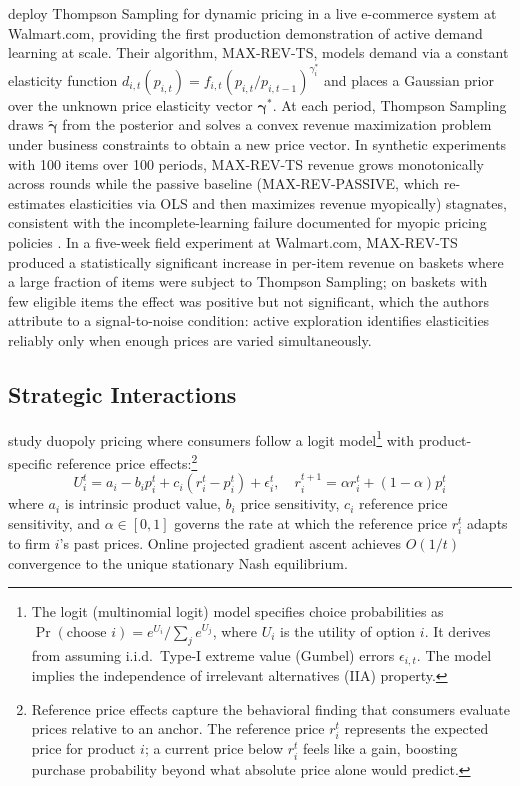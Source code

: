 \citet{Ganti2018} deploy Thompson Sampling for dynamic pricing in a live e-commerce system at Walmart.com, providing the first production demonstration of active demand learning at scale. Their algorithm, MAX-REV-TS, models demand via a constant elasticity function $d_{i,t}(p_{i,t}) = f_{i,t}(p_{i,t}/p_{i,t-1})^{\gamma^*_i}$ and places a Gaussian prior over the unknown price elasticity vector $\boldsymbol{\gamma}^*$. At each period, Thompson Sampling draws $\tilde{\boldsymbol{\gamma}}$ from the posterior and solves a convex revenue maximization problem under business constraints to obtain a new price vector. In synthetic experiments with 100 items over 100 periods, MAX-REV-TS revenue grows monotonically across rounds while the passive baseline (MAX-REV-PASSIVE, which re-estimates elasticities via OLS and then maximizes revenue myopically) stagnates, consistent with the incomplete-learning failure documented for myopic pricing policies \citep{Harrison2012}. In a five-week field experiment at Walmart.com, MAX-REV-TS produced a statistically significant increase in per-item revenue on baskets where a large fraction of items were subject to Thompson Sampling; on baskets with few eligible items the effect was positive but not significant, which the authors attribute to a signal-to-noise condition: active exploration identifies elasticities reliably only when enough prices are varied simultaneously.

\subsection{Strategic Interactions}

\citet{Guo2023} study duopoly pricing where consumers follow a logit model\footnote{The logit (multinomial logit) model specifies choice probabilities as $\Pr(\text{choose } i) = e^{U_i}/\sum_j e^{U_j}$, where $U_i$ is the utility of option $i$. It derives from assuming i.i.d.\ Type-I extreme value (Gumbel) errors $\epsilon_{i,t}$. The model implies the independence of irrelevant alternatives (IIA) property.} with product-specific reference price effects:\footnote{Reference price effects capture the behavioral finding that consumers evaluate prices relative to an anchor. The reference price $r^t_i$ represents the expected price for product $i$; a current price below $r^t_i$ feels like a gain, boosting purchase probability beyond what absolute price alone would predict.}
\begin{equation}
U^t_i = a_i - b_i p^t_i + c_i(r^t_i - p^t_i) + \epsilon^t_i, \quad r^{t+1}_i = \alpha r^t_i + (1-\alpha) p^t_i
\end{equation}
where $a_i$ is intrinsic product value, $b_i$ price sensitivity, $c_i$ reference price sensitivity, and $\alpha \in [0,1]$ governs the rate at which the reference price $r^t_i$ adapts to firm $i$'s past prices. Online projected gradient ascent achieves $O(1/t)$ convergence to the unique stationary Nash equilibrium.

